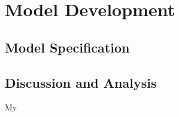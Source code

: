 \section{Model Development}
\subsection{Model Specification}
\subsection{Discussion and Analysis}
My 